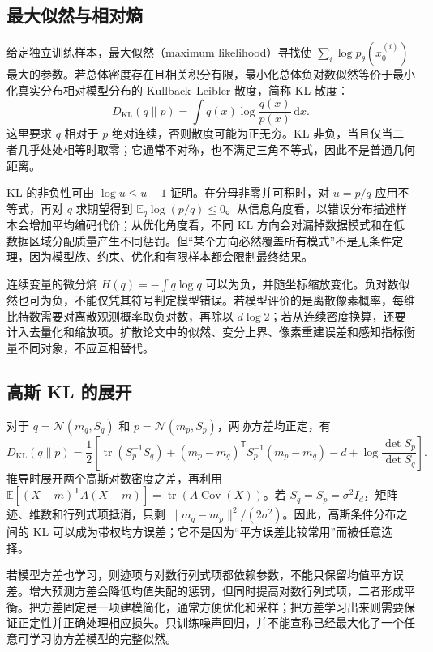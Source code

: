 \documentclass[UTF8,12pt,a4paper,fontset=fandol]{ctexart}
\begin{document}
\subsection{最大似然与相对熵}
给定独立训练样本，最大似然（maximum likelihood）寻找使 $\sum_i\log p_\theta(x_0^{(i)})$ 最大的参数。若总体密度存在且相关积分有限，最小化总体负对数似然等价于最小化真实分布相对模型分布的 Kullback--Leibler 散度，简称 KL 散度：
\begin{equation}
 D_{\mathrm{KL}}(q\|p)=\int q(x)\log\frac{q(x)}{p(x)}\,\mathrm dx.
 \label{eq:diff-kl}
\end{equation}
这里要求 $q$ 相对于 $p$ 绝对连续，否则散度可能为正无穷。KL 非负，当且仅当二者几乎处处相等时取零；它通常不对称，也不满足三角不等式，因此不是普通几何距离。

KL 的非负性可由 $\log u\leq u-1$ 证明。在分母非零并可积时，对 $u=p/q$ 应用不等式，再对 $q$ 求期望得到 $\mathbb E_q\log(p/q)\leq0$。从信息角度看，以错误分布描述样本会增加平均编码代价；从优化角度看，不同 KL 方向会对漏掉数据模式和在低数据区域分配质量产生不同惩罚。但“某个方向必然覆盖所有模式”不是无条件定理，因为模型族、约束、优化和有限样本都会限制最终结果。

连续变量的微分熵 $H(q)=-\int q\log q$ 可以为负，并随坐标缩放变化。负对数似然也可为负，不能仅凭其符号判定模型错误。若模型评价的是离散像素概率，每维比特数需要对离散观测概率取负对数，再除以 $d\log2$；若从连续密度换算，还要计入去量化和缩放项。扩散论文中的似然、变分上界、像素重建误差和感知指标衡量不同对象，不应互相替代。

\subsection{高斯 KL 的展开}
对于 $q=\mathcal N(m_q,S_q)$ 和 $p=\mathcal N(m_p,S_p)$，两协方差均正定，有
\begin{equation}
 D_{\mathrm{KL}}(q\|p)=\frac12\left[
 \operatorname{tr}(S_p^{-1}S_q)+(m_p-m_q)^\mathsf T S_p^{-1}(m_p-m_q)-d
 +\log\frac{\det S_p}{\det S_q}\right].
 \label{eq:diff-gaussian-kl}
\end{equation}
推导时展开两个高斯对数密度之差，再利用 $\mathbb E[(X-m)^\mathsf T A(X-m)]=\operatorname{tr}(A\operatorname{Cov}(X))$。若 $S_q=S_p=\sigma^2I_d$，矩阵迹、维数和行列式项抵消，只剩 $\|m_q-m_p\|^2/(2\sigma^2)$。因此，高斯条件分布之间的 KL 可以成为带权均方误差；它不是因为“平方误差比较常用”而被任意选择。

若模型方差也学习，则迹项与对数行列式项都依赖参数，不能只保留均值平方误差。增大预测方差会降低均值失配的惩罚，但同时提高对数行列式项，二者形成平衡。把方差固定是一项建模简化，通常方便优化和采样；把方差学习出来则需要保证正定性并正确处理相应损失。只训练噪声回归，并不能宣称已经最大化了一个任意可学习协方差模型的完整似然。
\end{document}
